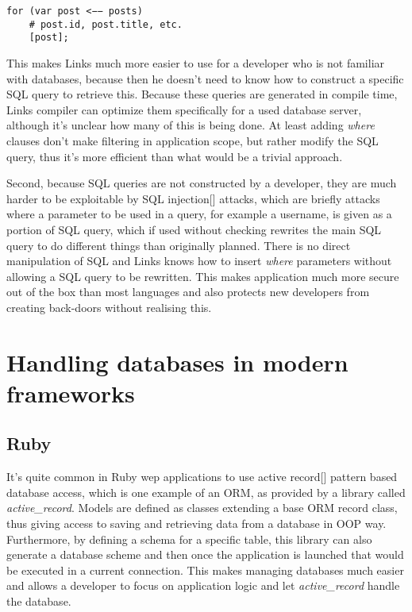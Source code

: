 \begin{codelisting}
\begin{verbatim}
for (var post <−− posts)
    # post.id, post.title, etc.
    [post];
\end{verbatim}
\end{codelisting}

This makes Links much more easier to use for a developer who is not familiar with databases, because then he doesn't need to know how to construct a specific SQL query to retrieve this. Because these queries are generated in compile time, Links compiler can optimize them specifically for a used database server, although it's unclear how many of this is being done. At least adding \textit{where} clauses don't make filtering in application scope, but rather modify the SQL query, thus it's more efficient than what would be a trivial approach.

Second, because SQL queries are not constructed by a developer, they are much harder to be exploitable by SQL injection[] attacks, which are briefly attacks where a parameter to be used in a query, for example a username, is given as a portion of SQL query, which if used without checking rewrites the main SQL query to do different things than originally planned. There is no direct manipulation of SQL and Links knows how to insert \textit{where} parameters without allowing a SQL query to be rewritten. This makes application much more secure out of the box than most languages and also protects new developers from creating back-doors without realising this. 

\section{Handling databases in modern frameworks}

\subsection{Ruby}

It's quite common in Ruby wep applications to use active record[] pattern based database access, which is one example of an ORM, as provided by a library called \textit{active\_record}. Models are defined as classes extending a base ORM record class, thus giving access to saving and retrieving data from a database in OOP way. Furthermore, by defining a schema for a specific table, this library can also generate a database scheme and then once the application is launched that would be executed in a current connection. This makes managing databases much easier and allows a developer to focus on application logic and let \textit{active\_record} handle the database.

